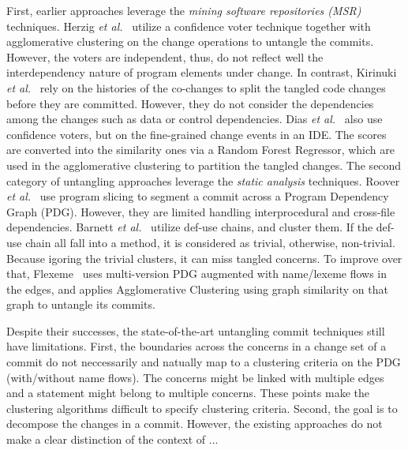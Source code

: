 First, earlier approaches leverage the {\em mining software
  repositories (MSR)} techniques. Herzig {\em et
  al.}~\cite{kim-msr13,kim-emse16} utilize a confidence voter
technique together with agglomerative clustering on the change
operations to untangle the commits.
However, the voters are independent, thus, do not reflect well the
interdependency nature of program elements under change. In contrast,
Kirinuki {\em et al.}~\cite{higo-apsec16, higo-icpc14} rely on the
histories of the co-changes to split the tangled code changes before
they are committed. However, they do not consider the dependencies
among the changes such as data or control dependencies. Dias {\em et
  al.}~\cite{dias-saner15} also use confidence voters, but on the
fine-grained change events in an IDE. The scores are converted into
the similarity ones via a Random Forest Regressor, which are used in
the agglomerative clustering to partition the tangled changes.  The
second category of untangling approaches leverage the {\em static
  analysis} techniques. Roover {\em et al.}~\cite{roover-scam18} use
program slicing to segment a commit across a Program Dependency Graph
(PDG).  However, they are limited handling interprocedural and
cross-file dependencies. Barnett {\em et al.}~\cite{barnett-icse15}
utilize def-use chains, and cluster them. If the def-use chain all
fall into a method, it is considered as trivial, otherwise,
non-trivial. Because igoring the trivial clusters, it can miss tangled
concerns. To improve over that, Flexeme~\cite{flexeme-fse20} uses
multi-version PDG augmented with name/lexeme flows in the edges, and
applies Agglomerative Clustering using graph similarity on that graph
to untangle its commits.

Despite their successes, the state-of-the-art untangling commit
techniques still have limitations. First, the boundaries across the
concerns in a change set of a commit do not neccessarily and natually
map to a clustering criteria on the PDG (with/without name flows).
The concerns might be linked with multiple edges and a statement might
belong to multiple concerns. These points make the clustering
algorithms difficult to specify clustering criteria. Second, the goal
is to decompose the changes in a commit. However, the existing
approaches do not make a clear distinction of the context
of ...
